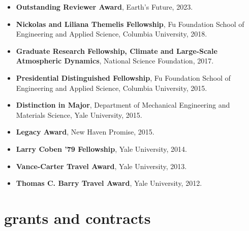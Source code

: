 \documentclass[10pt,oneside]{article}
\begin{document}
\begin{itemize}[label={}]
  
  \item \textbf{Outstanding Reviewer Award}, Earth's Future, 2023.
        
  \item \textbf{Nickolas and Liliana Themelis Fellowship}, Fu Foundation School of Engineering and Applied Science, Columbia University, 2018.
        
  \item \textbf{Graduate Research Fellowship, Climate and Large-Scale Atmospheric Dynamics}, National Science Foundation, 2017.
        
  \item \textbf{Presidential Distinguished Fellowship}, Fu Foundation School of Engineering and Applied Science, Columbia University, 2015.
        
  \item \textbf{Distinction in Major}, Department of Mechanical Engineering and Materials Science, Yale University, 2015.
        
  \item \textbf{Legacy Award}, New Haven Promise, 2015.
        
  \item \textbf{Larry Coben '79 Fellowship}, Yale University, 2014.
        
  \item \textbf{Vance-Carter Travel Award}, Yale University, 2013.
        
  \item \textbf{Thomas C. Barry Travel Award}, Yale University, 2012.
        
\end{itemize}



\section{grants and contracts}

\mbox{}\vspace{-\dimexpr\baselineskip\relax}
\end{document}
